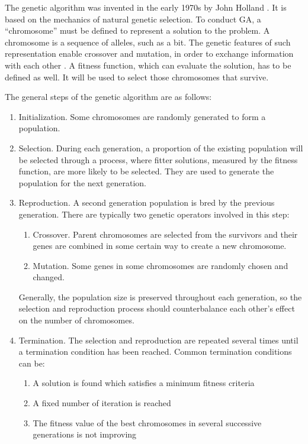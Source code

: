 \documentclass{article}
\begin{document}
The genetic algorithm was invented in the early 1970s by John Holland \cite{genetic-algorithm-review-and-application}.
It is based on the mechanics of natural genetic selection.
To conduct GA, a ``chromosome'' must be defined to represent a solution to the problem.
A chromosome is a sequence of alleles, such as a bit.
The genetic features of such representation enable crossover and mutation,
in order to exchange information with each other \cite{an-object-oriented-environment-for-specification}.
A fitness function, which can evaluate the solution, has to be defined as well.
It will be used to select those chromosomes that survive.

The general steps of the genetic algorithm are as follows:
\begin{enumerate}
    \item Initialization. Some chromosomes are randomly generated to form a population.
    \item Selection. During each generation, a proportion of the existing population will be selected
        through a process, where fitter solutions, measured by the fitness function, are more likely to be selected. They are used to generate the population for the next generation.
    \item Reproduction. A second generation population is bred by the previous generation. There are typically
        two genetic operators involved in this step:
        \begin{enumerate}
            \item Crossover. Parent chromosomes are selected from the survivors and their genes are combined in some certain way
                to create a new chromosome.
            \item Mutation. Some genes in some chromosomes are randomly chosen and changed.
        \end{enumerate}
        Generally, the population size is preserved throughout each generation,
        so the selection and reproduction process should counterbalance each other's effect on the number of chromosomes.
    \item Termination. The selection and reproduction are repeated several times until a termination condition has been reached.
        Common termination conditions can be:
        \begin{enumerate}
            \item A solution is found which satisfies a minimum fitness criteria
            \item A fixed number of iteration is reached
            \item The fitness value of the best chromosomes in several successive generations is not improving
        \end{enumerate}
\end{enumerate}
\end{document}
